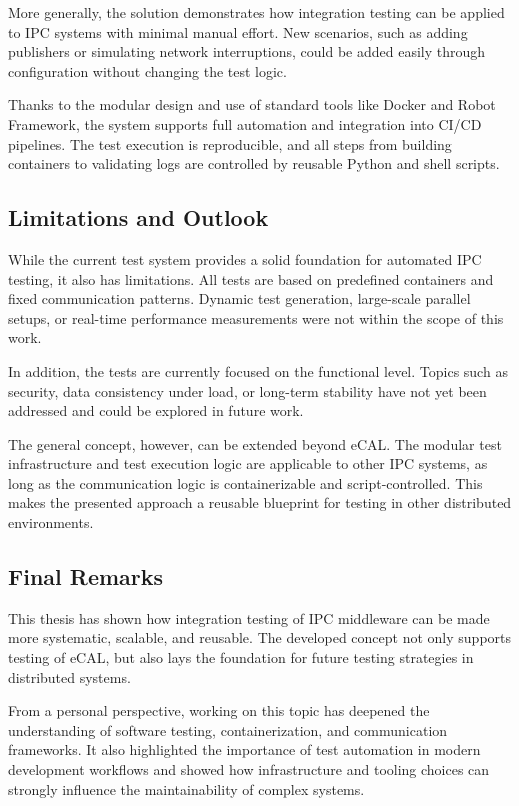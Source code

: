 \vspace{1em}
More generally, the solution demonstrates how integration testing can be applied to IPC systems with minimal manual effort. New scenarios, such as adding publishers or simulating network interruptions, could be added easily through configuration without changing the test logic.

\vspace{1em}
Thanks to the modular design and use of standard tools like Docker and Robot Framework, the system supports full automation and integration into CI/CD pipelines. The test execution is reproducible, and all steps from building containers to validating logs are controlled by reusable Python and shell scripts.

\vspace{1em}
\subsection*{Limitations and Outlook}

While the current test system provides a solid foundation for automated IPC testing, it also has limitations. All tests are based on predefined containers and fixed communication patterns. Dynamic test generation, large-scale parallel setups, or real-time performance measurements were not within the scope of this work.

\vspace{1em}
In addition, the tests are currently focused on the functional level. Topics such as security, data consistency under load, or long-term stability have not yet been addressed and could be explored in future work.

\vspace{1em}
The general concept, however, can be extended beyond eCAL. The modular test infrastructure and test execution logic are applicable to other IPC systems, as long as the communication logic is containerizable and script-controlled. This makes the presented approach a reusable blueprint for testing in other distributed environments.

\vspace{1em}
\subsection*{Final Remarks}

\vspace{1em}
This thesis has shown how integration testing of IPC middleware can be made more systematic, scalable, and reusable. The developed concept not only supports testing of eCAL, but also lays the foundation for future testing strategies in distributed systems.

\vspace{1em}
From a personal perspective, working on this topic has deepened the understanding of software testing, containerization, and communication frameworks. It also highlighted the importance of test automation in modern development workflows and showed how infrastructure and tooling choices can strongly influence the maintainability of complex systems.

